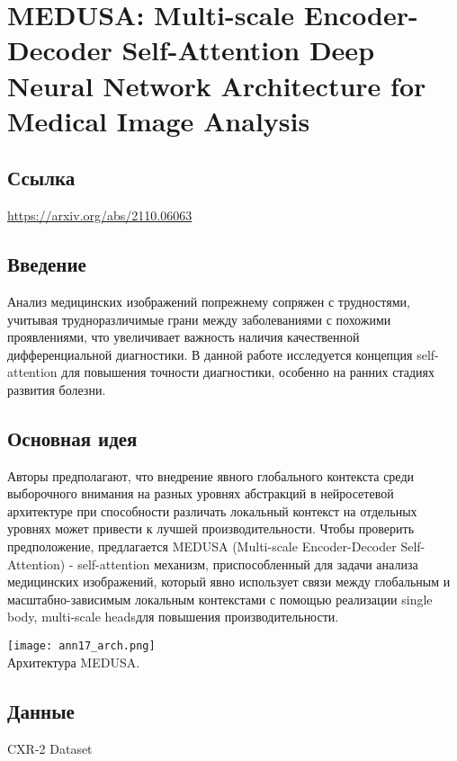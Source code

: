 \section{MEDUSA: Multi-scale Encoder-Decoder Self-Attention Deep Neural Network Architecture for Medical Image Analysis}

\subsection*{Ссылка} \url{https://arxiv.org/abs/2110.06063}
\subsection*{Введение}

Анализ медицинских изображений попрежнему сопряжен с трудностями, 
учитывая трудноразличимые грани между заболеваниями с похожими проявлениями, 
что увеличивает важность наличия качественной дифференциальной диагностики.
В данной работе исследуется концепция self-attention для повышения точности 
диагностики, особенно на ранних стадиях развития болезни.
\subsection*{Основная идея}
Авторы предполагают, что внедрение явного глобального контекста среди выборочного 
внимания на разных уровнях абстракций в нейросетевой архитектуре при способности различать 
локальный контекст на отдельных уровнях может привести к лучшей производительности.
Чтобы проверить предположение, предлагается MEDUSA (Multi-scale Encoder-Decoder Self-Attention) - 
self-attention механизм, приспособленный для задачи анализа медицинских изображений,
который явно использует связи между глобальным и масштабно-зависимым локальным контекстами 
с помощью реализации \glqq single body, multi-scale heads\grqq для повышения производительности.

\begin{minipage}{1.0\linewidth}
    \begin{center}
        \texttt{[image: ann17\_arch.png]} \\
        \caption{\scriptsize{
            Архитектура MEDUSA.
        }}
    \end{center}
    
\end{minipage} 

\subsection*{Данные}
CXR-2 Dataset
